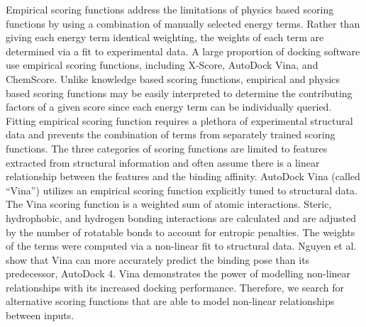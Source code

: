 \documentclass[linenumbers,doublespacing]{bmcart}
\begin{document}
Empirical scoring functions address the limitations of physics based scoring functions by using a combination of manually selected energy terms. Rather than giving each energy term identical weighting, the weights of each term are determined via a fit to experimental data. A large proportion of docking software use empirical scoring functions, including X-Score, AutoDock Vina, and ChemScore\cite{wang2002further,trott2010autodock,eldridge1997empirical}. Unlike knowledge based scoring functions, empirical and physics based scoring functions may be easily interpreted to determine the contributing factors of a given score since each energy term can be individually queried. Fitting empirical scoring function requires a plethora of experimental structural data and prevents the combination of terms from separately trained scoring functions. The three categories of scoring functions are limited to features extracted from structural information and often assume there is a linear relationship between the features and the binding affinity. AutoDock Vina (called ``Vina'') utilizes an empirical scoring function explicitly tuned to structural data\cite{trott2010autodock}. The Vina scoring function is a weighted sum of atomic interactions.  Steric, hydrophobic, and hydrogen bonding interactions are calculated and are adjusted by the number of rotatable bonds to account for entropic penalties. The weights of the terms were computed via a non-linear fit to structural data. Nguyen et al. \cite{nguyen2019autodock} show that Vina can more accurately predict the binding pose than its predecessor, AutoDock 4\cite{morris1998automated}. Vina demonstrates the power of modelling non-linear relationships with its increased docking performance. Therefore, we search for alternative scoring functions that are able to model non-linear relationships between inputs.
\end{document}
